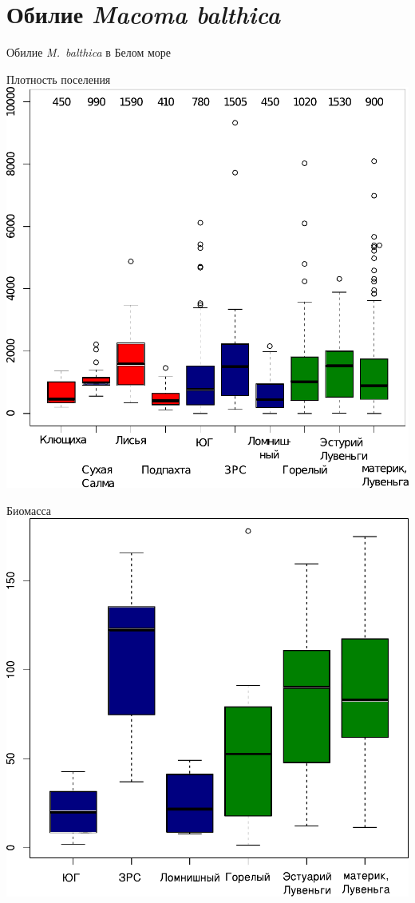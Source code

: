 \documentclass{beamer}
\begin{document}
		\section[Обилие]{Обилие {\it Macoma balthica}}
\begin{frame}{Обилие {\it M.~balthica} в Белом море}
	\begin{minipage}[t]{.49\linewidth}
		\begin{center}
		{\footnotesize Плотность поселения}
			\includegraphics[width=\textwidth]{N2_area_White2.pdf}
		\end{center}
	\end{minipage}
%
	\begin{minipage}[t]{.49\linewidth}
		\begin{center}
		{\footnotesize Биомасса}
			\includegraphics[width=\textwidth]{B_Kanda_ru2.pdf}

\end{center}
\end{minipage}
\end{frame}
\end{document}
